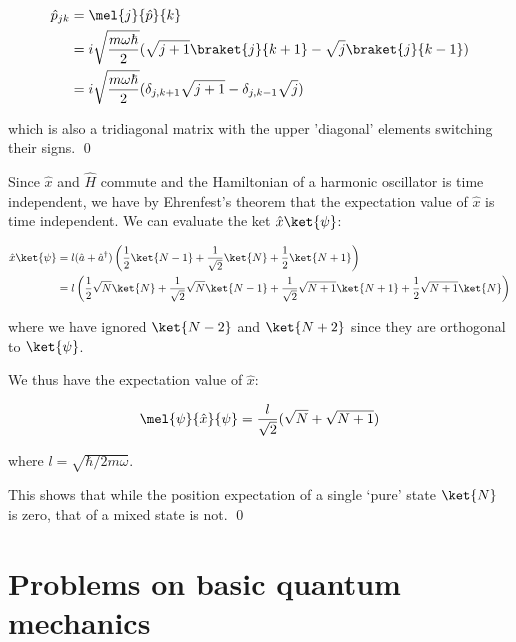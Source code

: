 \documentclass[12pt]{article}
\begin{document}
\begin{equation}
\begin{split}
    \hat{p}_{jk} &= \mel{j}{\hat{p}}{k} \\
    &= i \sqrt{\frac{m\omega \hbar}{2}} (\sqrt{j + 1} \braket{j}{k + 1} - \sqrt{j} \braket{j}{k - 1}) \\
    &= i \sqrt{\frac{m\omega \hbar}{2}} (\delta_{j, k + 1} \sqrt{j + 1} - \delta_{j, k - 1} \sqrt{j})
\end{split}
\end{equation}

which is also a tridiagonal matrix with the upper 'diagonal' elements switching their signs.
\qed


Since $\hat{x}$ and $\hat{H}$ commute and the Hamiltonian of a harmonic oscillator is time independent, we have by Ehrenfest's theorem that the expectation value of $\hat{x}$ is time independent. We can evaluate the ket $\hat{x} \ket{\psi}$:

\begin{equation}
\begin{split}
    \hat{x} \ket{\psi} &= l(\hat{a} + \hat{a}^{\dagger}) \left( \frac{1}{2} \ket{N - 1} + \frac{1}{\sqrt{2}} \ket{N} + \frac{1}{2} \ket{N + 1} \right) \\
    &= l \left( \frac{1}{2} \sqrt{N} \ket{N} + \frac{1}{\sqrt{2}} \sqrt{N} \ket{N - 1} + \frac{1}{\sqrt{2}} \sqrt{N + 1} \ket{N + 1} + \frac{1}{2} \sqrt{N + 1} \ket{N} \right) \\
\end{split}
\end{equation}

where we have ignored $\ket{N - 2}$ and $\ket{N + 2}$ since they are orthogonal to $\ket{\psi}$.

We thus have the expectation value of $\hat{x}$:

\begin{equation}
    \mel{\psi}{\hat{x}}{\psi} = \frac{l}{\sqrt{2}} (\sqrt{N} + \sqrt{N + 1})
\end{equation}

where $l = \sqrt{\hbar/2m\omega}$.

This shows that while the position expectation of a single `pure' state $\ket{N}$ is zero, that of a mixed state is not.
\qed


\pagebreak
\section*{Problems on basic quantum mechanics}
\end{document}

